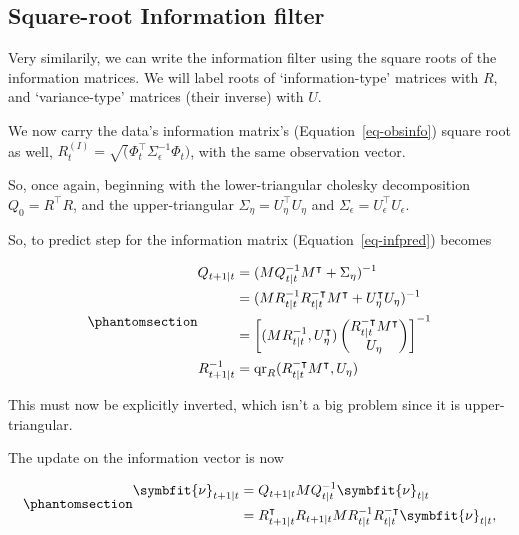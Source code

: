 \documentclass[
]{report}
\newcommand{\bv}[1]{\symbfit{#1}}
\theoremstyle{plain}
\theoremstyle{plain}
\theoremstyle{remark}
\begin{document}
\subsection{Square-root Information
filter}\label{square-root-information-filter}

Very similarily, we can write the information filter using the square
roots of the information matrices. We will label roots of
`information-type' matrices with \(R\), and `variance-type' matrices
(their inverse) with \(U\).

We now carry the data's information matrix's (Equation~\ref{eq-obsinfo})
square root as well,
\(R_t^{(I)} = \sqrt(\Phi_t^\intercal\Sigma_\epsilon^{-1} \Phi_t)\), with
the same observation vector.

So, once again, beginning with the lower-triangular cholesky
decomposition \(Q_0 = R^\intercal R\), and the upper-triangular
\(\Sigma_{\eta} = U_{\eta}^\intercal U_{\eta}\) and
\(\Sigma_\epsilon = U_{\epsilon}^\intercal U_{\epsilon}\).

So, to predict step for the information matrix
(Equation~\ref{eq-infpred}) becomes

\begin{equation}\phantomsection\label{eq-sqrtinfpred}{\begin{split}
  Q_{t+1\mid t} &= (M Q_{t\mid t}^{-1} M^\intercal + \Sigma_\eta)^{-1}\\
  &= (M R_{t\mid t}^{-1}R_{t\mid t}^{-\intercal} M^\intercal + U_\eta^\intercal U_\eta)^{-1}\\
  &= \left[(M R_{t\mid t}^{-1}, U_\eta^\intercal)\left(\begin{matrix}R_{t\mid t}^{-\intercal} M^\intercal\\U_\eta\end{matrix}\right)\right]^{-1}\\
  R_{t+1\mid t}^{-1} &= \mathrm{qr}_R(R_{t\mid t}^{-\intercal} M^\intercal, U_\eta)
\end{split}
}\end{equation}

This must now be explicitly inverted, which isn't a big problem since it
is upper-triangular.

The update on the information vector is now

\begin{equation}\phantomsection\label{eq-sqrtinfopred2}{\begin{split}
\bv\nu_{t+1\mid t} &= Q_{t+1\mid t} M Q_{t\mid t}^{-1} \bv \nu_{t\mid t}\\
&= R_{t+1\mid t}^\intercal R_{t+1\mid t} M R_{t\mid t}^{-1}R_{t\mid t}^{-\intercal} \bv \nu_{t\mid t}, 
\end{split}
}\end{equation}
\end{document}
